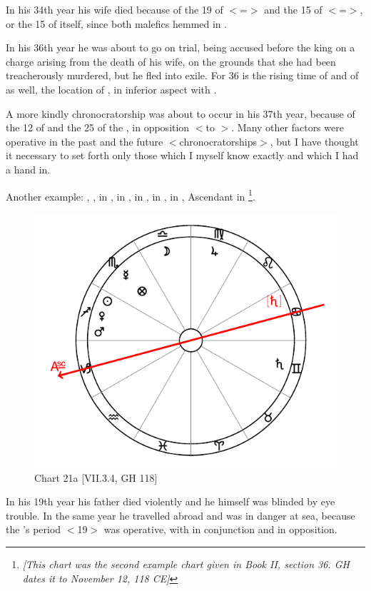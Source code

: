 In his 34th year his wife died because of the 19 of \Leo\xspace $<$=\Sun$>$ and the 15 of \Scorpio\xspace $<$=\Mars$>$, or the 15 of \Mars\xspace itself, since both malefics hemmed in \Venus. 

In his 36th year he was about to go on trial, being accused before the king on a charge arising from the death of his wife, on the grounds that she had been treacherously murdered, but he fled into exile. For
36 is the rising time of \Leo\xspace and of \Scorpio\xspace as well, the location of \Venus, in inferior aspect with \Saturn. 

A more kindly chronocratorship was about to occur in his 37th year, because of the 12 of \Jupiter\xspace and the 25 of the \Moon, in opposition $<$to \Jupiter$>$. Many other factors were operative in the past and the future $<$chronocratorships$>$, but I have thought it necessary to set forth only those which I myself know exactly
and which I had a hand in.

\newpage
Another example: \Sun, \Mars, \Venus\xspace in \Sagittarius, \Moon\xspace in \Libra, \Saturn\xspace in \Gemini, \Jupiter\xspace in
\Virgo, \Mercury\xspace in \Scorpio, Ascendant in \Capricorn\footnote{\textit{[This chart was the second example chart given in Book II, section 36. GH dates it to November 12, 118 CE]}}.

\begin{figure}
\centering
\vspace{-20pt}
\includegraphics[width=.68\textwidth]{charts/2_36_2}
\caption{Chart 21a [VII.3.4, GH 118]}
\label{fig:chart21a}
\end{figure} 

In his 19th year his father died violently and he himself was blinded by eye trouble. In the same year he travelled abroad and was in danger at sea, because the \Sun’s period $<$19$>$ was operative, with \Mars\xspace in conjunction and \Saturn in opposition. 

